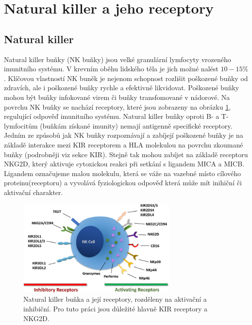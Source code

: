 \documentclass[czech,DP]{thesiskiv}
\numberwithin{equation}{section}
\begin{document}
\section{Natural killer a jeho receptory}
\subsection{Natural killer}
Natural killer buňky (NK buňky) jsou velké granulární lymfocyty vrozeného imunitního systému. V krevním oběhu lidského těla je jich možné nalést $10-15\%$. Klíčovou vlastností NK buněk je nejenom schopnost rozlišit poškozené buňky od zdravích, ale i poškozené buňky rychle a efektivně likvidovat. Poškozené buňky mohou být buňky infokované virem či buňky transfomované v nádorové. Na povrchu NK buňky se nachází receptory, které jsou zobrazeny na obrázku \ref{fig:NK_receptors}, regulující odpověď imunitního systému. Natural killer buňky oproti B- a T- lymfocitům (buňkám získané imunity) nemají antigenně specifické receptory. Jedním ze způsobů jak NK buňky rozpoznávají a zabíjejí poškozené buňky je na základě interakce mezi KIR receptorem a HLA molekulou na povrchu zkoumané buňky (podrobněji viz sekce KIR). Stejně tak mohou zabíjet na základě receptoru NKG2D, který aktivuje cytoxickou reakci při setkání s ligandem MICA a MICB. Ligandem označujeme malou molekulu, která se váže na vazebné místo cílového proteinu(receptoru) a vyvolává fyziologickou odpověď která může mít inihiční či aktivační charakter. 
\begin{figure}[H]		
		\centering
		\includegraphics[width=300px]{./img/nk_receptory.jpg}
		\caption{Natural killer buňka a její receptory, rozděleny na aktivační a inhibiční. Pro tuto práci jsou důležité hlavně KIR receptory a NKG2D. \cite{NK_receptors} }
		\label{fig:NK_receptors}
\end{figure}
\end{document}
